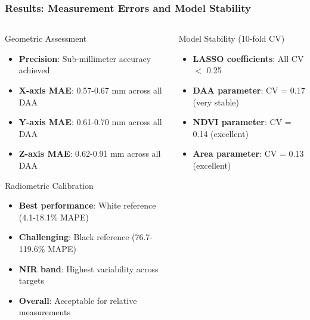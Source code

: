 \documentclass[aspectratio=43]{beamer}
\begin{document}
\begin{frame}
    \frametitle{Results: Measurement Errors and Model Stability}
    
    \begin{columns}
        \begin{column}{0.5\textwidth}
            \begin{block}{Geometric Assessment}
                \scriptsize
                \begin{itemize}
                    \item \textbf{Precision}: Sub-millimeter accuracy achieved
                    \item \textbf{X-axis MAE}: 0.57-0.67 mm across all DAA
                    \item \textbf{Y-axis MAE}: 0.61-0.70 mm across all DAA
                    \item \textbf{Z-axis MAE}: 0.62-0.91 mm across all DAA
                \end{itemize}
            \end{block}
            
            \begin{exampleblock}{Radiometric Calibration}
                \scriptsize
                \begin{itemize}
                    \item \textbf{Best performance}: White reference (4.1-18.1\% MAPE)
                    \item \textbf{Challenging}: Black reference (76.7-119.6\% MAPE)
                    \item \textbf{NIR band}: Highest variability across targets
                    \item \textbf{Overall}: Acceptable for relative measurements
                \end{itemize}
            \end{exampleblock}
        \end{column}
        
        \begin{column}{0.5\textwidth}
            \begin{block}{Model Stability (10-fold CV)}
                \scriptsize
                \begin{itemize}
                    \item \textbf{LASSO coefficients}: All CV \ensuremath{<} 0.25
                    \item \textbf{DAA parameter}: CV = 0.17 (very stable)
                    \item \textbf{NDVI parameter}: CV = 0.14 (excellent)
                    \item \textbf{Area parameter}: CV = 0.13 (excellent)
                \end{itemize}
            \end{block}
            

\end{column}
\end{columns}
\end{frame}
\end{document}
